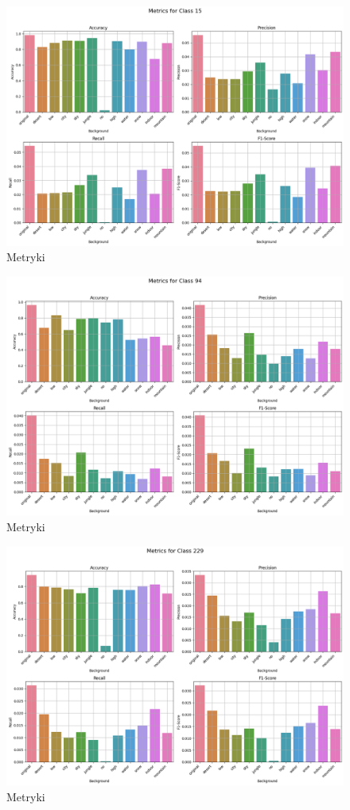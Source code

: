 \begin{figure}
	\centering\includegraphics[width=.9\textwidth]{img/15}
	\caption{Metryki}
	\label{rys:15}
\end{figure}

\begin{figure}
	\centering\includegraphics[width=.9\textwidth]{img/94}
	\caption{Metryki}
	\label{rys:94}
\end{figure}

\begin{figure}
	\centering\includegraphics[width=.9\textwidth]{img/229}
	\caption{Metryki}
	\label{rys:229}
\end{figure}

